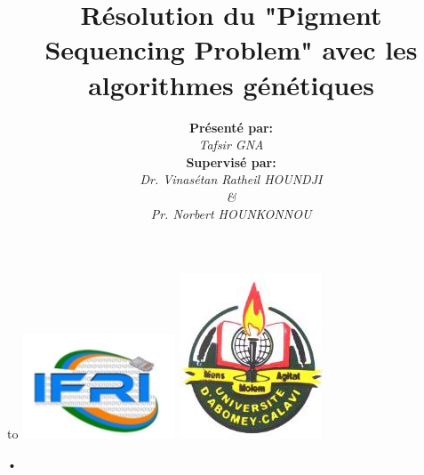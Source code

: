 \documentclass[11pt]{beamer}
\author{\textbf{Présenté par:} \\ \textit{Tafsir GNA} \\ \textbf{Supervisé par:} \\ \textit{Dr. Vinasétan Ratheil HOUNDJI \\ \& \\ Pr. Norbert HOUNKONNOU}}
\title{Résolution du "Pigment Sequencing Problem" avec les algorithmes génétiques}
\institute{Institut de Formation et de Recherche en Informatique (IFRI)}
\begin{document}
 
 \begin{frame}
	\hbox to \textwidth
 	{
 		\includegraphics[scale=0.2]{img/ifri_logo.png}
 		\hfill
 		\includegraphics[scale=0.2]{img/uac_logo.png}
 	}
	\titlepage
\end{frame} 
 
 
 
 
 \begin{frame}{•}
 
 \end{frame}
 
 
\end{document}
